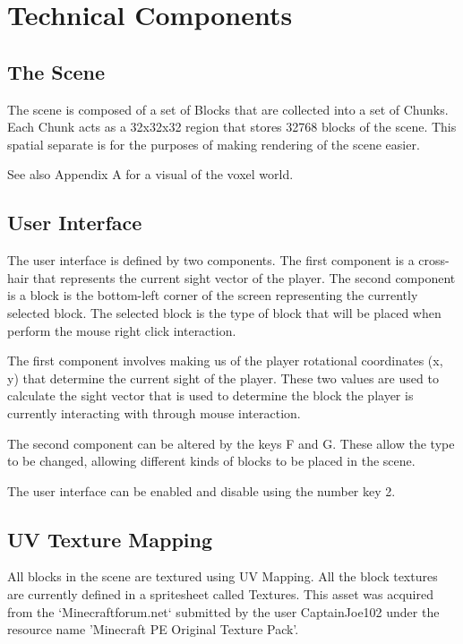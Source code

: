 \documentclass{book}
\begin{document}

\chapter{Technical Components}
\section{The Scene}
The scene is composed of a set of Blocks that are collected into a set of Chunks.  Each Chunk acts as a 32x32x32 region that stores 32768 blocks of the scene.  This spatial separate is for the purposes of making rendering of the scene easier. 
  
See also Appendix A for a visual of the voxel world.
  
\section{User Interface}
The user interface is defined by two components.  The first component is a cross-hair that represents the current sight vector of the player.  The second component is a block is the bottom-left corner of the screen representing the currently selected block.  The selected block is the type of block that will be placed when perform the mouse right click interaction.
    
The first component involves making us of the player rotational coordinates (x, y) that determine the current sight of the player.  These two values are used to calculate the sight vector that is used to determine the block the player is currently interacting with through mouse interaction.
    
The second component can be altered by the keys F and G.  These allow the type to be changed, allowing different kinds of blocks to be placed in the scene.
    
The user interface can be enabled and disable using the number key 2. 
    
\section{UV Texture Mapping}
All blocks in the scene are textured using UV Mapping.  All the block textures are currently defined in a spritesheet called Textures.  This asset was acquired from the `Minecraftforum.net`
submitted by the user CaptainJoe102 under the resource name 'Minecraft PE Original Texture Pack'.
    
\end{document}

